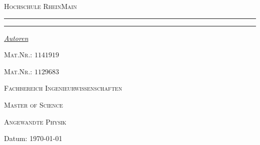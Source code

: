 \begin{titlepage}
	\newcommand{\HRule}{\rule{\linewidth}{0.5mm}}
	\centering
	\textsc{\Large Hochschule RheinMain} \par

	\begin{center}
		
	\end{center}
	\textsc{\LARGE \titleLV}\vspace{0.5cm}
	\HRule\vspace{0.6cm}
	{\huge\bfseries \subtitleA}\par\vspace{0.4cm} %
	{\huge\bfseries \subtitleB}\par\vspace{0.4cm}
	\HRule\vspace{1.5cm}
	\begin{minipage}{0.4\textwidth}
		\centering
		\Large
		\textit{\underline{Autoren}}\par\vspace{0.5cm}
		\textsc{\nameA}\par\vspace{0.25cm}
		\large
		\textsc{Mat.Nr.: \(1141919\)}\par\vspace{.5cm}
		\Large
		\textsc{\nameB}\par\vspace{0.25cm}
		\large
		\textsc{Mat.Nr.: \(1129683\)}\par\vspace{2cm}
	\end{minipage}
	\vfill\vfill\vfill
	\textsc{\Large Fachbereich Ingenieurwissenschaften}\par\vspace{0.5cm}\par
	\textsc{\large Master of Science}\par\vspace{0.5cm}
	\textsc{\large Angewandte Physik}\par\vspace{0.2cm}
	\vfill
	\begin{flushleft}
		Datum:\hspace{0.4cm} {\large\today}
	\end{flushleft}
\end{titlepage}